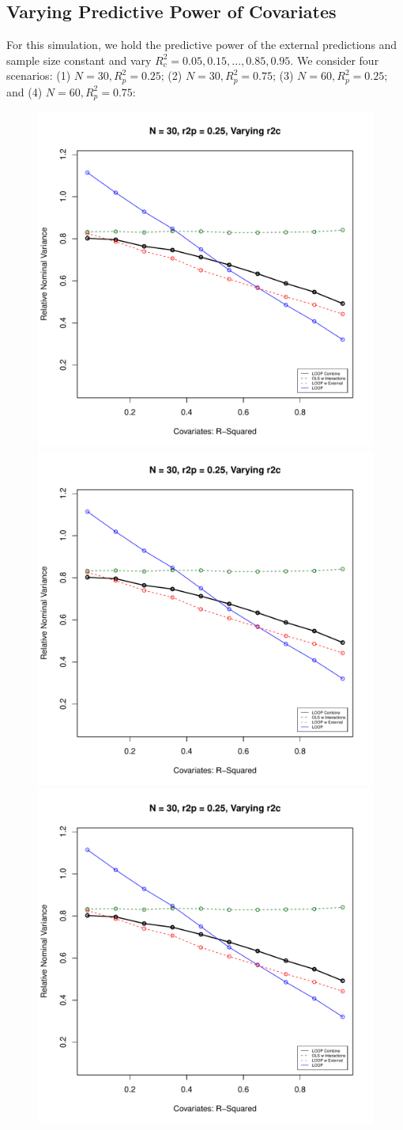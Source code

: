 \subsection{Varying Predictive Power of Covariates}
For this simulation, we hold the predictive power of the external predictions and sample size constant and vary $R^2_c = 0.05, 0.15, ..., 0.85, 0.95$. We consider four scenarios: (1) $N = 30, R^2_p = 0.25$; (2) $N = 30, R^2_p = 0.75$; (3) $N = 60, R^2_p = 0.25$; and (4) $N = 60, R^2_p = 0.75$:
\begin{figure}[H]
	\centering
	\includegraphics[width=.49\linewidth]{images/r2c.pdf} 
	\includegraphics[width=.49\linewidth,page = 2]{images/r2c.pdf} \quad
	\smallskip
	\includegraphics[width=.49\linewidth,page = 3]{images/r2c.pdf} 

\end{figure}
